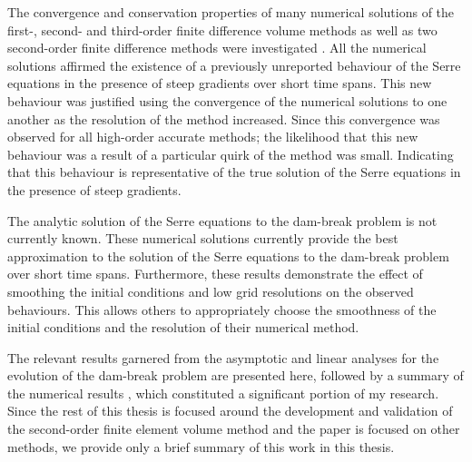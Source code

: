 The convergence and conservation properties of many numerical solutions of the first-, second- and third-order finite difference volume methods as well as two second-order finite difference methods were investigated \cite{Pitt-2018-61}. All the numerical solutions affirmed the existence of a previously unreported behaviour of the Serre equations in the presence of steep gradients over short time spans. This new behaviour was justified using the convergence of the numerical solutions to one another as the resolution of the method increased. Since this convergence was observed for all high-order accurate methods; the likelihood that this new behaviour was a result of a particular quirk of the method was small. Indicating that this behaviour is representative of the true solution of the Serre equations in the presence of steep gradients.

The analytic solution of the Serre equations to the dam-break problem is not currently known. These numerical solutions \cite{Pitt-2018-61} currently provide the best approximation to the solution of the Serre equations to the dam-break problem over short time spans. Furthermore, these results demonstrate the effect of smoothing the initial conditions and low grid resolutions on the observed behaviours. This allows others to appropriately choose the smoothness of the initial conditions and the resolution of their numerical method.

The relevant results garnered from the asymptotic \cite{El-etal-2006} and linear \cite{Dougalis-etal-2007} analyses for the evolution of the dam-break problem are presented here, followed by a summary of the numerical results \cite{Pitt-2018-61}, which constituted a significant portion of my research. Since the rest of this thesis is focused around the development and validation of the second-order finite element volume method and the paper \cite{Pitt-2018-61} is focused on other methods, we provide only a brief summary of this work in this thesis.

